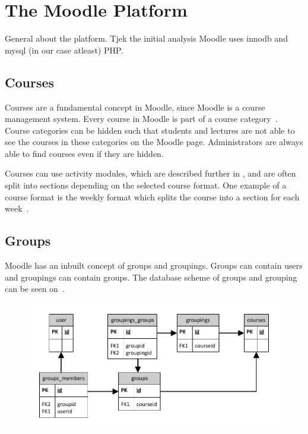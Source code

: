 
\section{The Moodle Platform}
\label{sec:moodleplatform}
	General about the platform. Tjek the initial analysis
Moodle uses innodb and mysql (in our case atleast) 
PHP.



\subsection{Courses}
\label{sub:courses}
Courses are a fundamental concept in Moodle, since Moodle is a course management system.
Every course in Moodle is part of a course category~\cite{moodlecoursecategories}. 
Course categories can be hidden such that students and lectures are not able to see the courses in these categories on the Moodle page.
Administrators are always able to find courses even if they are hidden.

Courses can use activity modules, which are described further in , and are often split into sections depending on the selected course format.
One example of a course format is the weekly format which splits the course into a section for each week~\cite{moodlecourseformat}.

\subsection{Groups}
Moodle has an inbuilt concept of groups and groupings. 
Groups can contain users and groupings can contain groups. 
The database scheme of groups and grouping can be seen on~.

\begin{figure}
	\centering
		\includegraphics[width=\textwidth]{images/moodlegroups}
	\label{fig:moodlegroupsandgroupings}
\end{figure}

